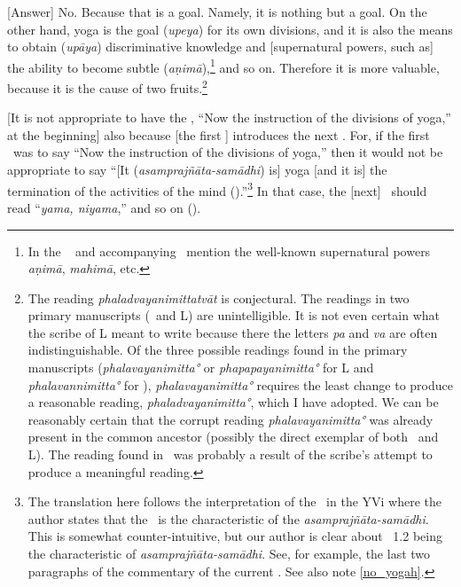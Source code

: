 [Answer] No.%
 Because that is a goal.  Namely, it is nothing but
a goal.  On the other hand, yoga is the goal (\emph{upeya}) for its own divisions, and it is also the means to obtain (\emph{upāya}) discriminative knowledge and [supernatural powers, such as] the ability to become subtle (\emph{aṇimā}),\footnote{In the \PYS\  and accompanying \bhasya\ mention the well-known supernatural powers \emph{aṇimā}, \emph{mahimā}, etc.} and so on.  Therefore it is more valuable, because it is the cause of two fruits.\footnote{The reading \emph{phaladvayanimittatvāt} is conjectural.  The readings in two primary manu\-scripts (\Tm\ and L) are unintelligible.  It is not even certain what the scribe of L meant to write because there the letters \emph{pa} and \emph{va} are often indistinguishable.  Of the three possible readings found in the primary manuscripts (\emph{phalavayanimitta°} or \emph{phapapayanimitta°} for L and \emph{phalavannimitta°} for \Tm), \emph{phalavayanimitta°} requires the least change to produce a reasonable reading, \emph{phaladvayanimitta°}, which I have adopted.  We can be reasonably certain that the corrupt reading \emph{phalavayanimitta°} was already present in the common ancestor (possibly the direct exemplar of both \Tm\ and L).  The reading found in \Tm\ was probably a result of the scribe's attempt to produce a meaningful reading.}

[It is not appropriate to have the
\sutra, ``Now the instruction of the divisions of yoga,'' at the
beginning]%
 also because [the first \sutra] introduces the next \sutra.
For, if the first \sutra\ was to say ``Now the instruction of the
divisions of yoga,'' then it would not be appropriate to say
``[It (\emph{asamprajñāta-samādhi}) is] yoga [and it is] the termination of the activities of the mind ().''\footnote{\label{YS12first}The translation here follows the interpretation of the \sutra\ in the YVi where the author states that the \sutra\ is the characteristic of the \emph{asamprajñāta-samādhi}.  This is somewhat counter-intuitive, but our author is clear about \sutra\ 1.2 being the characteristic of \emph{asamprajñāta-samādhi}.  See, for example, the last two paragraphs of the commentary of the current \sutra.  See also note \ref{no_yogah}.}
In that case, the [next] \sutra\ should read ``\emph{yama, niyama},''
and so on ().

